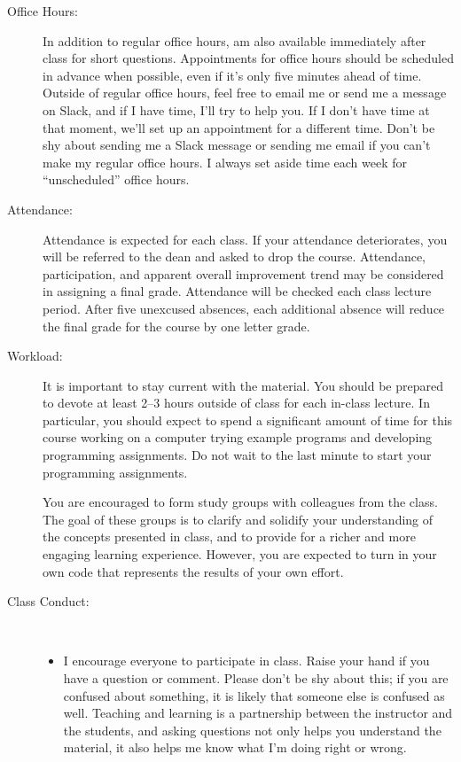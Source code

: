 \documentclass [letterpaper,11pt]{article}
\begin{document}
\begin{description}
\item[Office Hours:]
In addition to regular office hours, am also available immediately after class for 
short questions.  Appointments for office hours should be scheduled in advance when possible, even if it's only five minutes ahead of time.  Outside of regular office hours, feel free to email me or send me a message on Slack, and if I have time, I'll try to help you.  If I don't have time at that moment, we'll set up an
appointment for a different time.
Don't be shy about sending me a Slack message or sending me email
if you can't make my regular office hours.  I always set aside time each week for ``unscheduled'' office hours.

\item[Attendance:]
Attendance is expected for each class. If your attendance deteriorates, you will be referred to the dean and asked to drop the course. Attendance, participation, and apparent overall improvement trend may be considered in assigning a final grade.
Attendance will be checked each class lecture period.  After five unexcused absences, each additional absence will reduce the final grade for the course by one letter grade.

\item[Workload:]
It is important to stay current with the material.  You should be prepared to devote  at least 2--3 hours outside of class for each in-class lecture.  In particular, you should expect to spend a significant amount of time for this course working on a computer trying example programs and developing programming assignments. Do not wait to the last minute to start your programming assignments.

You are encouraged to form study groups with colleagues from the class. The goal of these groups is to clarify and solidify your understanding of the concepts presented in class, and to provide for a richer and more engaging learning experience. However, you are expected to turn in your own code that represents the results of your own effort.

\item[Class Conduct:] \
   \begin{itemize}\setlength{\itemsep}{0em}\setlength{\parskip}{0pt}
   	\item I encourage everyone to participate in class.  Raise your hand if you have a question
	or comment. Please don't be shy about this; if you are confused about
	something, it is likely that someone else is confused as well.
		Teaching and learning is a partnership between the instructor and the students, and asking questions not only helps you understand the material, it also
		helps me know what I'm doing right or wrong.


\end{itemize}
\end{description}
\end{document}
